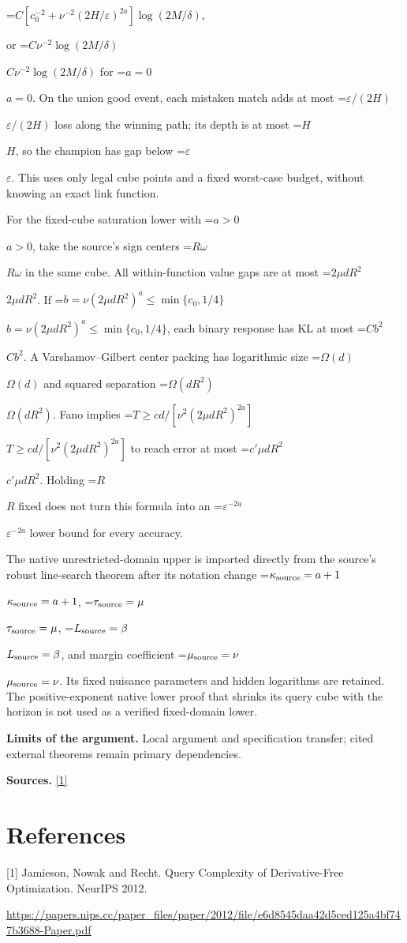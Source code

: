 \documentclass[10pt,a4paper]{article}
\newcommand{\AtlasMath}[1]{\par\begingroup\centering\setbox0=\hbox{$\displaystyle #1$}\ifdim\wd0>1.4\linewidth\typeout{ATLAS WIDE FORMULA: \the\wd0}\fi\ifdim\wd0>\linewidth\resizebox{\linewidth}{!}{\box0}\else\box0\fi\par\endgroup}
\newcommand{\AtlasInlineMath}[1]{\begingroup\setbox0=\hbox{$#1$}\ifdim\wd0>.4\linewidth\endgroup\AtlasMath{#1}\else\endgroup$#1$\fi}
\begin{document}
\AtlasMath{C[c_0^{-2}+\nu^{-2}(2H/\varepsilon)^{2a}]\log(2M/\delta),}

or \AtlasInlineMath{C\nu^{-2}\log(2M/\delta)} for \AtlasInlineMath{a=0}. On the union good event, each mistaken match adds at most \AtlasInlineMath{\varepsilon/(2H)} loss along the winning path; its depth is at most \AtlasInlineMath{H}, so the champion has gap below \AtlasInlineMath{\varepsilon}. This uses only legal cube points and a fixed worst-case budget, without knowing an exact link function.

For the fixed-cube saturation lower with \AtlasInlineMath{a>0}, take the source's sign centers \AtlasInlineMath{R\omega} in the same cube. All within-function value gaps are at most \AtlasInlineMath{2\mu dR^2}. If \AtlasInlineMath{b=\nu(2\mu dR^2)^a\le\min\{c_0,1/4\}}, each binary response has KL at most \AtlasInlineMath{Cb^2}. A Varshamov--Gilbert center packing has logarithmic size \AtlasInlineMath{\Omega(d)} and squared separation \AtlasInlineMath{\Omega(dR^2)}. Fano implies \AtlasInlineMath{T\ge cd/[\nu^2(2\mu dR^2)^{2a}]} to reach error at most \AtlasInlineMath{c'\mu dR^2}. Holding \AtlasInlineMath{R} fixed does not turn this formula into an \AtlasInlineMath{\varepsilon^{-2a}} lower bound for every accuracy.

The native unrestricted-domain upper is imported directly from the source's robust line-search theorem after its notation change \AtlasInlineMath{\kappa_{\rm source}=a+1}, \AtlasInlineMath{\tau_{\rm source}=\mu}, \AtlasInlineMath{L_{\rm source}=\beta}, and margin coefficient \AtlasInlineMath{\mu_{\rm source}=\nu}. Its fixed nuisance parameters and hidden logarithms are retained. The positive-exponent native lower proof that shrinks its query cube with the horizon is not used as a verified fixed-domain lower.

\textbf{Limits of the argument.} Local argument and specification transfer; cited external theorems remain primary dependencies.

\textbf{Sources.} \href{https://papers.nips.cc/paper_files/paper/2012/file/e6d8545daa42d5ced125a4bf747b3688-Paper.pdf}{[1]}

\section{References}
[1] Jamieson, Nowak and Recht. Query Complexity of Derivative-Free Optimization. NeurIPS 2012.

\url{https://papers.nips.cc/paper_files/paper/2012/file/e6d8545daa42d5ced125a4bf747b3688-Paper.pdf}
\end{document}
